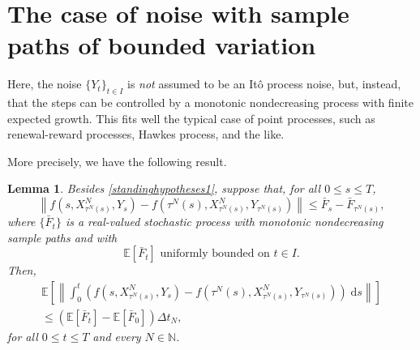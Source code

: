 \documentclass[reqno,12pt]{amsart}
\theoremstyle{plain} %
\newtheorem{lemma}{Lemma}[section]
\theoremstyle{definition} %
\begin{document}
\section{The case of noise with sample paths of bounded variation}
\label{secmonotonicbound}

Here, the noise $\{Y_t\}_{t\in I}$ is \emph{not} assumed to be an It\^o process noise, but, instead, that the steps can be controlled by a monotonic nondecreasing process with finite expected growth. This fits well the typical case of point processes, such as renewal-reward processes, Hawkes process, and the like.

More precisely, we have the following result.
\begin{lemma}
    \label{lemmonotonicbound}
    Besides \cref{standinghypotheses1}, suppose that, for all $0 \leq s \leq T$,
    \begin{equation}
        \label{stepbound}
          \left\|f(s, X_{\tau^N(s)}^N, Y_s) - f({\tau^N(s)}, X_{\tau^N(s)}^N, Y_{\tau^N(s)})\right\| \leq \bar F_s - \bar F_{\tau^N(s)},
      \end{equation}
      where $\{\bar F_t\}$ is a real-valued stochastic process with monotonic nondecreasing sample paths and with
      \begin{equation}
        \label{expectstepmonotonic}
        \mathbb{E}[\bar F_t] \textrm{ uniformly bounded on } t\in I.
      \end{equation}
      Then,
      \begin{multline}
        \label{expectintfboundbyG}
          \mathbb{E}\left[\left\|\int_0^t \left( f(s, X_{\tau^N(s)}^N, Y_s) - f(\tau^N(s), X_{\tau^N(s)}^N, Y_{\tau^N(s)}) \right)\;\mathrm{d}s\right\|\right] \\
          \leq (\mathbb{E}[\bar F_t] - \mathbb{E}[\bar F_0])\Delta t_N,
      \end{multline}
      for all $0 \leq t \leq T$ and every $N\in \mathbb{N}$.
\end{lemma}
\end{document}
